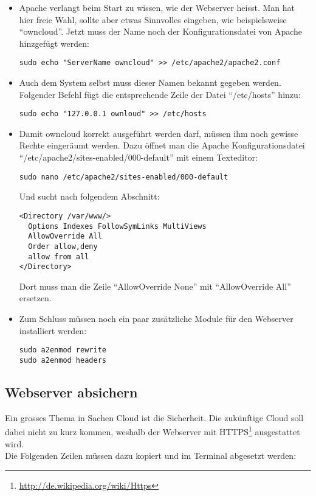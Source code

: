 \begin{itemize}
  \item Apache verlangt beim Start zu wissen, wie der Webserver heisst. Man hat hier freie Wahl, sollte aber etwas Sinnvolles eingeben, wie beispielsweise ``owncloud''.
  \subitem Jetzt muss der Name noch der Konfigurationsdatei von Apache hinzgefügt werden:
    \begin{lstlisting}
sudo echo "ServerName owncloud" >> /etc/apache2/apache2.conf
    \end{lstlisting}
  \item Auch dem System selbst muss dieser Namen bekannt gegeben werden. Folgender Befehl fügt die entsprechende Zeile der Datei ``/etc/hosts'' hinzu:
    \begin{lstlisting}
sudo echo "127.0.0.1 ownloud" >> /etc/hosts
    \end{lstlisting}
  \item Damit owncloud korrekt ausgeführt werden darf, müssen ihm noch gewisse Rechte eingeräumt werden.
    Dazu öffnet man die Apache Konfigurationsdatei ``/etc/apache2/sites-enabled/000-default'' mit einem Texteditor:
    \begin{lstlisting}
sudo nano /etc/apache2/sites-enabled/000-default
    \end{lstlisting}
    Und sucht nach folgendem Abschnitt:
    \begin{lstlisting}
<Directory /var/www/>
  Options Indexes FollowSymLinks MultiViews
  AllowOverride All
  Order allow,deny
  allow from all
</Directory>
    \end{lstlisting}
    Dort muss man die Zeile ``AllowOverride None'' mit ``AllowOverride All'' ersetzen.
  \item Zum Schluss müssen noch ein paar zusätzliche Module für den Webserver installiert werden:
    \begin{lstlisting}
sudo a2enmod rewrite
sudo a2enmod headers
    \end{lstlisting}
\end{itemize}

\subsection{Webserver absichern}
Ein grosses Thema in Sachen Cloud ist die Sicherheit. Die zukünftige Cloud soll dabei nicht zu kurz kommen, weshalb der Webserver mit HTTPS\footnote{\url{http://de.wikipedia.org/wiki/Https}} ausgestattet wird.
\\
Die Folgenden Zeilen müssen dazu kopiert und im Terminal abgesetzt werden:

